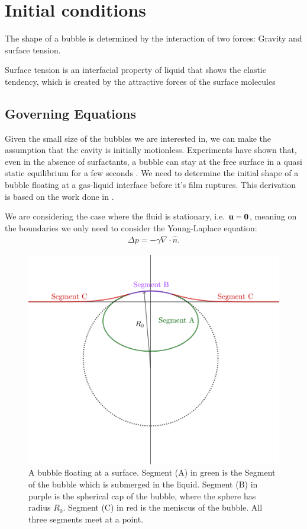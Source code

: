 \section{Initial conditions}
The shape of a bubble is determined by the interaction of two forces: Gravity and surface tension.

Surface tension is an interfacial property of liquid that shows the elastic tendency, which is created by the attractive forces of the surface molecules



\subsection{Governing Equations}
Given the small size of the bubbles we are interested in, we can make the assumption that the cavity is initially motionless. Experiments have shown that, even in the absence of surfactants, a bubble can stay at the free surface in a quasi static equilibrium for a few seconds \cite{blanchard1988film}.
We need to determine the initial shape of a bubble floating at a gas-liquid interface before it's film ruptures. This derivation is based on the work done in \cite{toba1959drop}.

We are considering the case where the fluid is stationary, i.e. $\bf{u} = \bf{0}$, meaning on the boundaries we only need to consider the Young-Laplace equation:
\begin{align}
    \Delta p=-\gamma \nabla \cdot \hat n.
\end{align}

\begin{figure}
    \centering
    \includegraphics[width=0.7\linewidth]{WriteUp/images/bubble at surface.png}
    \caption{A bubble floating at a surface. Segment (A) in green is the Segment of the bubble which is submerged in the liquid. Segment (B) in purple is the spherical cap of the bubble, where the sphere has radius $R_0$. Segment (C) in red is the meniscus of the bubble. All three segments meet at a point.}
    \label{fig:2}
\end{figure}

